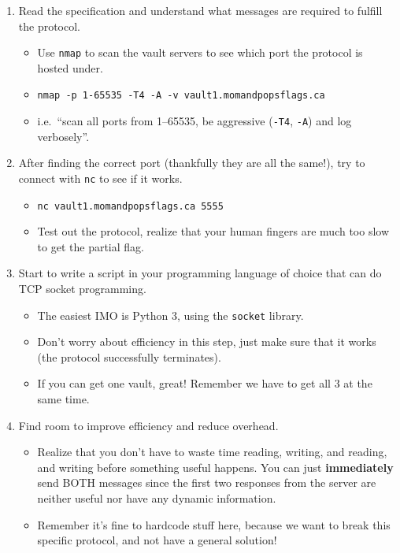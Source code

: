 \documentclass[11pt]{article}
\begin{document}
    \begin{enumerate}
        \item Read the specification and understand what messages are required to fulfill the protocol.
        \begin{itemize}
            \item Use \verb`nmap` to scan the vault servers to see which port the protocol is hosted under.
            \item \verb`nmap -p 1-65535 -T4 -A -v vault1.momandpopsflags.ca`
            \item i.e.\ ``scan all ports from 1--65535, be aggressive (\verb`-T4`, \verb`-A`) and log verbosely''.
        \end{itemize}
        \item After finding the correct port (thankfully they are all the same!), try to connect with \verb`nc` to see if it works.
        \begin{itemize}
            \item \verb`nc vault1.momandpopsflags.ca 5555`
            \item Test out the protocol, realize that your human fingers are much too slow to get the partial flag.
        \end{itemize}
        \item Start to write a script in your programming language of choice that can do TCP socket programming.
        \begin{itemize}
            \item The easiest IMO is Python 3, using the \verb`socket` library.
            \item Don't worry about efficiency in this step, just make sure that it works (the protocol successfully terminates).
            \item If you can get one vault, great! Remember we have to get all 3 at the same time.
        \end{itemize}
        \item Find room to improve efficiency and reduce overhead.
        \begin{itemize}
            \item Realize that you don't have to waste time reading, writing, and reading, and writing before something useful happens. You can just \textbf{immediately} send BOTH messages since the first two responses from the server are neither useful nor have any dynamic information.
            \item Remember it's fine to hardcode stuff here, because we want to break this specific protocol, and not have a general solution!

\end{itemize}
\end{enumerate}
\end{document}
